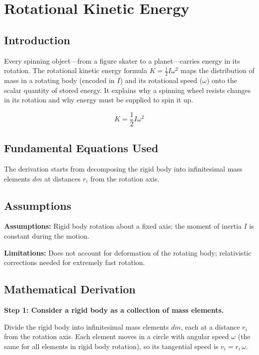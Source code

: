 \chapter{Rotational Kinetic Energy}

\section*{Introduction}

Every spinning object---from a figure skater to a planet---carries energy in its rotation. The rotational kinetic energy formula $K = \frac{1}{2}I\omega^2$ maps the distribution of mass in a rotating body (encoded in $I$) and its rotational speed ($\omega$) onto the scalar quantity of stored energy. It explains why a spinning wheel resists changes in its rotation and why energy must be supplied to spin it up.


\begin{equation}
K = \frac{1}{2}I\omega^2
\end{equation}

\section*{Fundamental Equations Used}

The derivation starts from decomposing the rigid body into infinitesimal mass elements $dm$ at distances $r_i$ from the rotation axis.

\section*{Assumptions}

\textbf{Assumptions:} Rigid body rotation about a fixed axis; the moment of inertia $I$ is constant during the motion.


\textbf{Limitations:} Does not account for deformation of the rotating body; relativistic corrections needed for extremely fast rotation.


\section*{Mathematical Derivation}

\textbf{Step 1: Consider a rigid body as a collection of mass elements.}

Divide the rigid body into infinitesimal mass elements $dm$, each at a distance $r_i$ from the rotation axis. Each element moves in a circle with angular speed $\omega$ (the same for all elements in rigid body rotation), so its tangential speed is $v_i = r_i\,\omega$.

